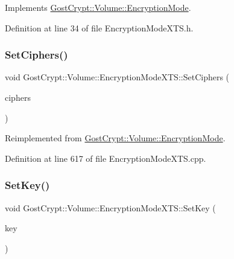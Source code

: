 Implements \hyperlink{class_gost_crypt_1_1_volume_1_1_encryption_mode_ae64e9d022e271f747376c9db2aaad1b4}{Gost\+Crypt\+::\+Volume\+::\+Encryption\+Mode}.



Definition at line 34 of file Encryption\+Mode\+X\+T\+S.\+h.

\mbox{\label{class_gost_crypt_1_1_volume_1_1_encryption_mode_x_t_s_a053dbb2201d89cc400416b63c57787de}} 
\subsubsection{\texorpdfstring{Set\+Ciphers()}{SetCiphers()}}
{\footnotesize\ttfamily void Gost\+Crypt\+::\+Volume\+::\+Encryption\+Mode\+X\+T\+S\+::\+Set\+Ciphers (\begin{DoxyParamCaption}\item[{const \hyperlink{namespace_gost_crypt_1_1_volume_ad32c730cdf3a63d2bafbac0f63f0740f}{Cipher\+Algorithm\+List} \&}]{ciphers }\end{DoxyParamCaption})\hspace{0.3cm}{\ttfamily [virtual]}}



Reimplemented from \hyperlink{class_gost_crypt_1_1_volume_1_1_encryption_mode_a96e5d889932eb1b2a3c657cd409198f6}{Gost\+Crypt\+::\+Volume\+::\+Encryption\+Mode}.



Definition at line 617 of file Encryption\+Mode\+X\+T\+S.\+cpp.

\mbox{\label{class_gost_crypt_1_1_volume_1_1_encryption_mode_x_t_s_a730bb23e5adffa958904aa91cacc8b74}} 
\subsubsection{\texorpdfstring{Set\+Key()}{SetKey()}}
{\footnotesize\ttfamily void Gost\+Crypt\+::\+Volume\+::\+Encryption\+Mode\+X\+T\+S\+::\+Set\+Key (\begin{DoxyParamCaption}\item[{const \hyperlink{class_gost_crypt_1_1_buffer_ptr}{Buffer\+Ptr} \&}]{key }\end{DoxyParamCaption})\hspace{0.3cm}{\ttfamily [virtual]}}




